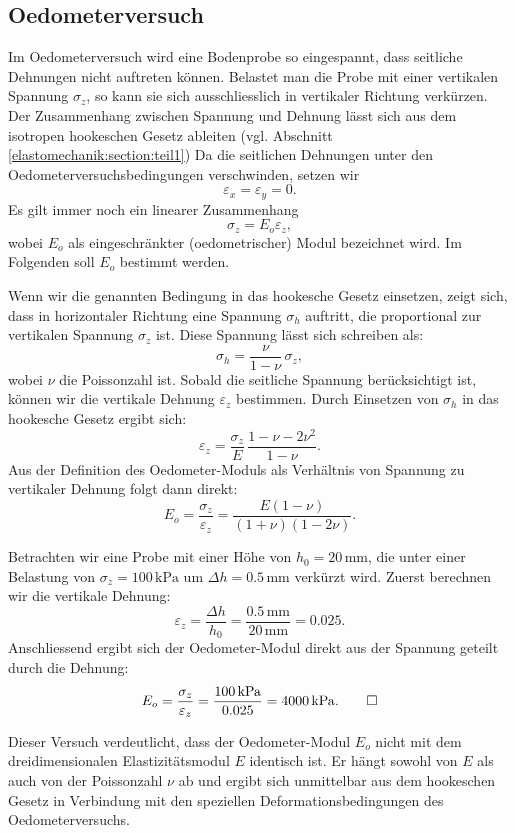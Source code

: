 \subsection{Oedometerversuch}
Im Oedometerversuch wird eine Bodenprobe so eingespannt, dass seitliche Dehnungen nicht auftreten können. 
Belastet man die Probe mit einer vertikalen Spannung \(\sigma_z\), so kann sie sich ausschliesslich in vertikaler Richtung verkürzen.  
Der Zusammenhang zwischen Spannung und Dehnung lässt sich aus dem isotropen hookeschen Gesetz ableiten
(vgl. Abschnitt \ref{elastomechanik:section:teil1})
Da die seitlichen Dehnungen unter den Oedometerversuchsbedingungen verschwinden, setzen wir
\[
  \varepsilon_x = \varepsilon_y = 0.
\]
Es gilt immer noch ein linearer Zusammenhang
\[
  \sigma_z = E_o \varepsilon_z,%
\]
wobei \(E_{o}\) als eingeschränkter (oedometrischer) Modul
bezeichnet wird.
Im Folgenden soll \(E_{o}\) bestimmt werden.

Wenn wir die genannten Bedingung in das hookesche Gesetz einsetzen, zeigt sich, dass in horizontaler Richtung eine Spannung \(\sigma_h\) auftritt, die proportional zur vertikalen Spannung \(\sigma_z\) ist. 
Diese Spannung lässt sich schreiben als:
\[
  \sigma_h = \frac{\nu}{1-\nu}\,\sigma_z,
\]
wobei \(\nu\) die Poissonzahl ist.  
Sobald die seitliche Spannung berücksichtigt ist, können wir die vertikale Dehnung \(\varepsilon_z\) bestimmen. 
Durch Einsetzen von \(\sigma_h\) in das hookesche Gesetz ergibt sich:
\[
  \varepsilon_z = \frac{\sigma_z}{E}\,\frac{1-\nu-2\nu^2}{1-\nu}.
\]
Aus der Definition des Oedometer-Moduls als Verhältnis von Spannung zu vertikaler Dehnung folgt dann direkt:
\[
  E_o = \frac{\sigma_z}{\varepsilon_z} = \frac{E(1-\nu)}{(1+\nu)(1-2\nu)}.
\]
\begin{beispiel}   
Betrachten wir eine Probe mit einer Höhe von \(h_0 = 20\,\mathrm{mm}\), die unter einer Belastung von \(\sigma_z = 100\,\mathrm{kPa}\) um \(\Delta h = 0.5\,\mathrm{mm}\) verkürzt wird.  
Zuerst berechnen wir die vertikale Dehnung:
\[
  \varepsilon_z
= \frac{\Delta h}{h_0}
= \frac{0.5\,\mathrm{mm}}{20\,\mathrm{mm}} = 0.025.
\]
Anschliessend ergibt sich der Oedometer-Modul direkt aus der Spannung geteilt durch die Dehnung:
\[
  E_o = \frac{\sigma_z}{\varepsilon_z}
=
\frac{100\,\mathrm{kPa}}{0.025} = 4000\,\mathrm{kPa}.
\qedhere
\]
\end{beispiel}  
Dieser Versuch verdeutlicht, dass der Oedometer-Modul \(E_o\) nicht mit dem dreidimensionalen Elastizitätsmodul \(E\) identisch ist. 
Er hängt sowohl von \(E\) als auch von der Poissonzahl \(\nu\) ab und ergibt sich unmittelbar aus dem hookeschen Gesetz in Verbindung mit den speziellen Deformationsbedingungen des Oedometerversuchs.
